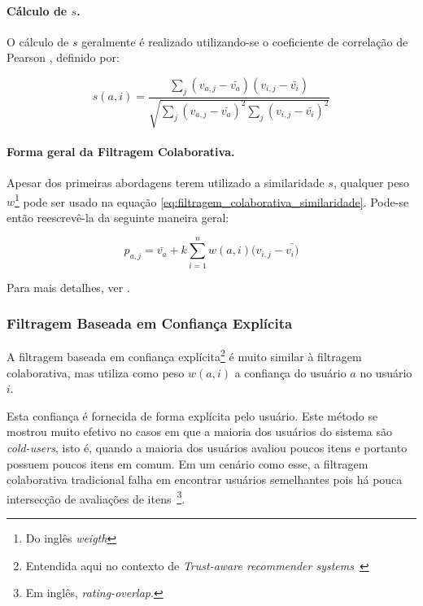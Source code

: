 \paragraph{Cálculo de $s$.}

O cálculo de $s$ geralmente é realizado utilizando-se o coeficiente de correlação de Pearson \cite{Breese98}, definido por:

\begin{equation}
\label{eq:calculo_s}
 s(a,i) = \frac{\sum_{j}{(v_{a,j} - \bar{v_{a}}) (v_{i,j} - \bar{v_{i}})}}{\sqrt{\sum_{j}{(v_{a,j} - \bar{v_{a}})}^2\sum_{j}{(v_{i,j} - \bar{v_{i}})}^2}}
\end{equation}

\paragraph{Forma geral da Filtragem Colaborativa.}

Apesar dos primeiras abordagens terem utilizado a similaridade $s$, qualquer peso $w$\footnote{Do inglês \textit{weigth}} pode ser usado na equação \ref{eq:filtragem_colaborativa_similaridade}. Pode-se então reescrevê-la da seguinte maneira geral:

\begin{equation}
 p_{a,j} = \bar{v_{a}} + k\sum_{i=1}^n{w(a,i) (v_{i,j} - \bar{v_{i})}}
 \label{eq:filtragem_colaborativa_geral} 
\end{equation}

Para mais detalhes, ver \cite{Breese98}.


\subsubsection{Filtragem Baseada em Confiança Explícita} %
\label{sec:confianca_explicita}

A filtragem baseada em confiança explícita\footnote{Entendida aqui no contexto de \textit{Trust-aware recommender systems}~\cite{Massa07}} é muito similar à filtragem colaborativa, mas utiliza como peso $w(a,i)$ a confiança do usuário $a$ no usuário $i$.

Esta confiança é fornecida de forma explícita pelo usuário. Este método se mostrou muito efetivo no casos em que a maioria dos usuários do sistema são \textit{cold-users}, isto é, quando a maioria dos usuários avaliou poucos itens e portanto possuem poucos itens em comum. Em um cenário como esse, a filtragem colaborativa tradicional falha em encontrar usuários semelhantes pois há pouca intersecção de avaliações de itens~\footnote{Em inglês, \textit{rating-overlap}.}.

